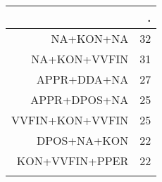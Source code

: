 \begin{tabular}{rr}
  \lsptoprule
 & . \\ 
  \midrule
NA+KON+NA &  32 \\ 
  NA+KON+VVFIN &  31 \\ 
  APPR+DDA+NA &  27 \\ 
  APPR+DPOS+NA &  25 \\ 
  VVFIN+KON+VVFIN &  25 \\ 
  DPOS+NA+KON &  22 \\ 
  KON+VVFIN+PPER &  22 \\ 
   \lspbottomrule
\end{tabular}

